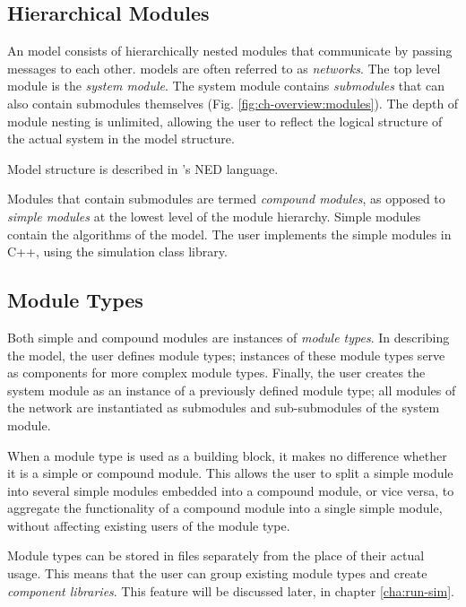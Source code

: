 \subsection{Hierarchical Modules}
\label{sec:overview:hierarchical-modules}


An {\opp} model consists of hierarchically nested
modules that communicate by passing
messages to each other.
{\opp} models are often referred to as \textit{networks}. The top
level module is the \textit{system module}.  The system module
contains \textit{submodules} that can also contain submodules
themselves (Fig. \ref{fig:ch-overview:modules}). The depth of module
nesting is unlimited, allowing the user to reflect the logical
structure of the actual system in the model structure.

Model structure is described in {\opp}'s NED language.

Modules that contain submodules are termed \textit{compound
  modules}, as opposed to \textit{simple
  modules} at the lowest level of the
module hierarchy. Simple modules contain the algorithms of the model.
The user implements the simple modules in C++, using the {\opp}
simulation class library.


\subsection{Module Types}
\label{sec:overview:module-types}

Both simple and compound modules are instances of \textit{module
  types}. In describing the model, the user defines module types;
instances of these module types serve as components for more complex
module types. Finally, the user creates the system module as an
instance of a previously defined module type; all modules of the
network are instantiated as submodules and sub-submodules of the
system module.

When a module type is used as a building block, it makes no difference
whether it is a simple or compound module. This allows
the user to split a simple module into several
simple modules embedded into a compound module,
or vice versa, to aggregate the functionality of a compound module into a
single simple module, without affecting existing users of the module
type.

Module types can be stored in files separately from the place
of their actual usage. This means that the user can group existing
module types and create \textit{component libraries}. This feature
will be discussed later, in chapter \ref{cha:run-sim}.



